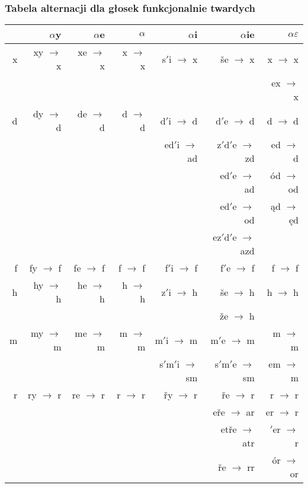 \documentclass{beamer}
\begin{document}
\begin{frame}
\frametitle{Tabela alternacji dla głosek funkcjonalnie twardych}
\begin{scriptsize}\begin{longtable}{r|rrrrrr}
 & \boldmath$\alpha${\rm y} & \boldmath$\alpha${\rm e} & \boldmath$\alpha$ & \boldmath$\alpha${\rm i} & \boldmath$\alpha${\rm ie} & \boldmath$\alpha\varepsilon$\\
\hline
x & xy $\rightarrow$ x & xe $\rightarrow$ x & x $\rightarrow$ x & s$'$i $\rightarrow$ x & še $\rightarrow$ x & x $\rightarrow$ x\\
 &  &  &  &  &  & ex $\rightarrow$ x\\
\hline
d & dy $\rightarrow$ d & de $\rightarrow$ d & d $\rightarrow$ d & d$'$i $\rightarrow$ d & d$'$e $\rightarrow$ d & d $\rightarrow$ d\\
 &  &  &  & ed$'$i $\rightarrow$ ad & z$'$d$'$e $\rightarrow$ zd & ed $\rightarrow$ d\\
 &  &  &  &  & ed$'$e $\rightarrow$ ad & ód $\rightarrow$ od\\
 &  &  &  &  & ed$'$e $\rightarrow$ od & ąd $\rightarrow$ ęd\\
 &  &  &  &  & ez$'$d$'$e $\rightarrow$ azd & \\
\hline
f & fy $\rightarrow$ f & fe $\rightarrow$ f & f $\rightarrow$ f & f$'$i $\rightarrow$ f & f$'$e $\rightarrow$ f & f $\rightarrow$ f\\
\hline
h & hy $\rightarrow$ h & he $\rightarrow$ h & h $\rightarrow$ h & z$'$i $\rightarrow$ h & še $\rightarrow$ h & h $\rightarrow$ h\\
 &  &  &  &  & že $\rightarrow$ h & \\
\hline
m & my $\rightarrow$ m & me $\rightarrow$ m & m $\rightarrow$ m & m$'$i $\rightarrow$ m & m$'$e $\rightarrow$ m & m $\rightarrow$ m\\
 &  &  &  & s$'$m$'$i $\rightarrow$ sm & s$'$m$'$e $\rightarrow$ sm & em $\rightarrow$ m\\
\hline
r & ry $\rightarrow$ r & re $\rightarrow$ r & r $\rightarrow$ r & řy $\rightarrow$ r & ře $\rightarrow$ r & r $\rightarrow$ r\\
 &  &  &  &  & eře $\rightarrow$ ar & er $\rightarrow$ r\\
 &  &  &  &  & etře $\rightarrow$ atr & $'$er $\rightarrow$ r\\
 &  &  &  &  & ře $\rightarrow$ rr & ór $\rightarrow$ or\\

\end{longtable}
\end{scriptsize}
\end{frame}
\end{document}
